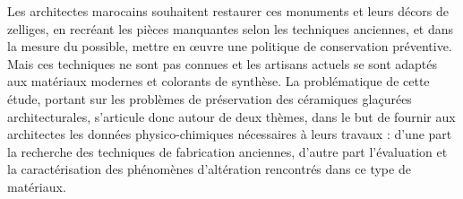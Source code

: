 \bigskip

\begin{shapedcutout}{3}{15}{\mycut}
Les architectes marocains souhaitent restaurer ces monuments et 
leurs décors de zelliges, en recréant les pièces manquantes selon 
les techniques anciennes, et dans la mesure du possible, mettre en 
{\oe}uvre une politique de conservation préventive. Mais ces 
techniques ne sont pas connues et les artisans actuels se sont 
adaptés aux matériaux modernes et colorants de synthèse.
La problématique de cette étude, portant sur les problèmes de 
préservation des céramiques glaçurées architecturales, s'articule 
donc autour de deux thèmes, dans le but de fournir aux architectes 
les données physico-chimiques nécessaires à leurs travaux : d'une 
part la recherche des techniques de fabrication anciennes, d'autre 
part l'évaluation et la caractérisation des phénomènes d'altération 
rencontrés dans ce type de matériaux.
\end{shapedcutout}



